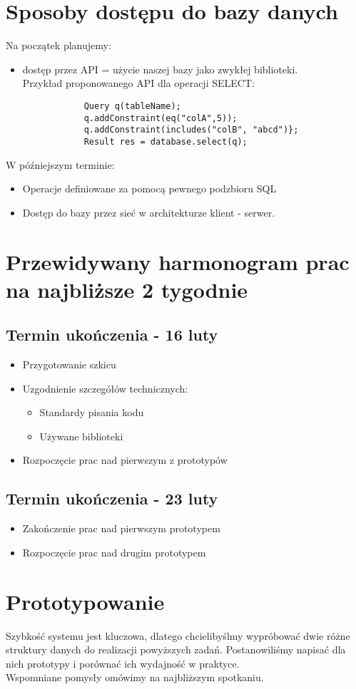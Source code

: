 \documentclass[11pt]{article}
\begin{document}
    \section{Sposoby dostępu do bazy danych}
        Na początek planujemy:
        \begin{itemize}
            \item
                dostęp przez API = użycie naszej bazy jako zwykłej biblioteki.\\
                Przykład proponowanego API dla operacji SELECT:
        \begin{lstlisting}
            Query q(tableName);
            q.addConstraint(eq("colA",5));
            q.addConstraint(includes("colB", "abcd")};
            Result res = database.select(q);
        \end{lstlisting}
        \end{itemize}
        W późniejszym terminie:
        \begin{itemize}
            \item Operacje definiowane za pomocą pewnego podzbioru SQL
            \item Dostęp do bazy przez sieć w architekturze klient - serwer.
        \end{itemize}
    \section{Przewidywany harmonogram prac na najbliższe 2 tygodnie}
        \subsection{Termin ukończenia - 16 luty}
            \begin{itemize}
                \item Przygotowanie szkicu
                \item Uzgodnienie szczegółów technicznych:
                    \begin{itemize}
                        \item Standardy pisania kodu
                        \item Używane biblioteki
                    \end{itemize}
                \item Rozpoczęcie prac nad pierwszym z prototypów
            \end{itemize}
        \subsection{Termin ukończenia - 23 luty}
            \begin{itemize}
                \item Zakończenie prac nad pierwszym prototypem
                \item Rozpoczęcie prac nad drugim prototypem
            \end{itemize}
    \section{Prototypowanie}
        Szybkość systemu jest kluczowa, dlatego chcielibyślmy wypróbować dwie różne struktury danych do realizacji powyższych zadań. Postanowiliśmy napisać dla nich prototypy i porównać ich wydajność w praktyce.\\Wspomniane pomysły omówimy na najbliższym spotkaniu.
\end{document}
